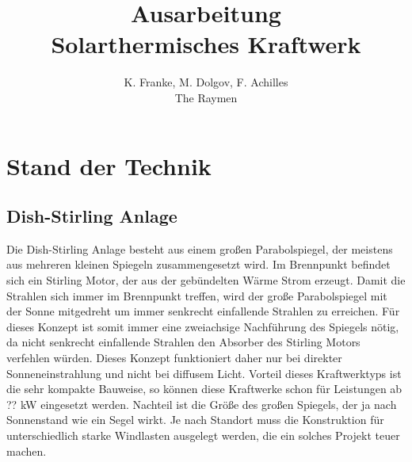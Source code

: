 \documentclass[fontsize=10pt,paper=a4,bibliography=totoc]{scrartcl}
\title{Ausarbeitung\\Solarthermisches Kraftwerk}
\author{K. Franke, M. Dolgov, F. Achilles\\The Raymen}
\begin{document}
\maketitle

\section{Stand der Technik}

\subsection{Dish-Stirling Anlage}
Die Dish-Stirling Anlage besteht aus einem großen Parabolspiegel, der meistens aus mehreren kleinen Spiegeln zusammengesetzt wird. Im Brennpunkt befindet sich ein Stirling Motor, der aus der gebündelten Wärme Strom erzeugt. Damit die Strahlen sich immer im Brennpunkt treffen, wird der große Parabolspiegel mit der Sonne mitgedreht um immer senkrecht einfallende Strahlen zu erreichen. Für dieses Konzept ist somit immer eine zweiachsige Nachführung des Spiegels nötig, da nicht senkrecht einfallende Strahlen den Absorber des Stirling Motors verfehlen würden. Dieses Konzept funktioniert daher nur bei direkter Sonneneinstrahlung und nicht bei diffusem Licht. Vorteil dieses Kraftwerktyps ist die sehr kompakte Bauweise, so können diese Kraftwerke schon für Leistungen ab ??
 kW eingesetzt werden. Nachteil ist die Größe des großen Spiegels, der ja nach Sonnenstand wie ein Segel wirkt. Je nach Standort muss die Konstruktion für unterschiedlich starke Windlasten ausgelegt werden, die ein solches Projekt teuer machen. 
 
\end{document}
